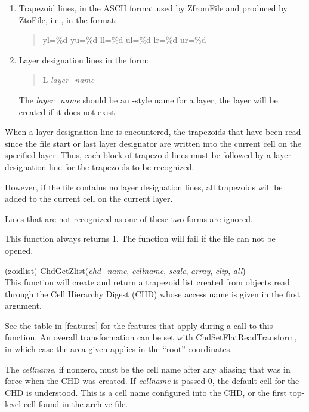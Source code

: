 \begin{description}
\begin{enumerate}
\item{Trapezoid lines, in the ASCII format used by {\vt ZfromFile} and
produced by {\vt ZtoFile}, i.e., in the format:
\begin{quote}
\vt yl=\%d yu=\%d ll=\%d ul=\%d lr=\%d ur=\%d
\end{quote}
}

\item{Layer designation lines in the form:
\begin{quote}
{\vt L} {\it layer\_name}
\end{quote}
The {\it layer\_name} should be an {\Xic}-style name for a 
layer, the layer will be created if it does not exist.
}
\end{enumerate}

When a layer designation line is encountered, the trapezoids that have
been read since the file start or last layer designator are written
into the current cell on the specified layer.  Thus, each block of
trapezoid lines must be followed by a layer designation line for the
trapezoids to be recognized. 

However, if the file contains no layer designation lines, all   
trapezoids will be added to the current cell on the current layer.  

Lines that are not recognized as one of these two forms are ignored.

This function always returns 1.  The function will fail if the file
can not be opened.

\item{(zoidlist) \vt ChdGetZlist({\it chd\_name\/}, {\it cellname\/},
{\it scale\/}, {\it array\/}, {\it clip\/}, {\it all\/})}\\
This function will create and return a trapezoid list created from
objects read through the Cell Hierarchy Digest (CHD) whose access name
is given in the first argument.

See the table in \ref{features} for the features that apply during a
call to this function.  An overall transformation can be set with {\vt
ChdSetFlatReadTransform}, in which case the area given applies in the
``root'' coordinates.

The {\it cellname}, if nonzero, must be the cell name after any
aliasing that was in force when the CHD was created.  If {\it
cellname} is passed 0, the default cell for the CHD is understood. 
This is a cell name configured into the CHD, or the first top-level
cell found in the archive file.


\end{description}
